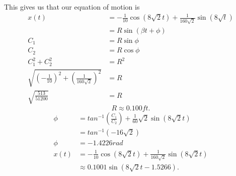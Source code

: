 \begin{problem}
    This gives us that our equation of motion is 
    \begin{align*}
      x(t)&=-\frac{1}{10}\cos\left( 8\sqrt{2} t \right) +\frac{1}{160\sqrt{2} }\sin\left( 8\sqrt{t}  \right) \\
          &=R\sin\left( \beta t+\phi \right) \\
      C_1&=R\sin\phi\\
      C_2&=R\cos\phi\\
      C_1^2+C_2^2&=R^2\\
      \sqrt{\left( -\frac{1}{10} \right) ^2+\left( \frac{1}{160\sqrt{2} } \right) ^2} &= R\\
      \sqrt{\frac{513}{51200}} &=R
    \end{align*}
    \[
      \boxed{R\approx0.100ft}
    .\] 
    \begin{align*}
      \phi&=tan^{-1}\left( \frac{C_1}{C_2} \right)+\frac{1}{60}\sqrt{2} \sin(8\sqrt{2} t) \\
          &=tan^{-1}\left( -16\sqrt{2}  \right) \\
      \phi&=-1.4226rad\\
      x(t)&= -\frac{1}{10}\cos\left( 8\sqrt{2}t  \right)+\frac{1}{160\sqrt{2} }\sin\left( 8\sqrt{2}t  \right) \\
          &\approx 0.1001\sin\left( 8\sqrt{2} t-1.5266 \right) 
    .\end{align*}
  \end{problem}


